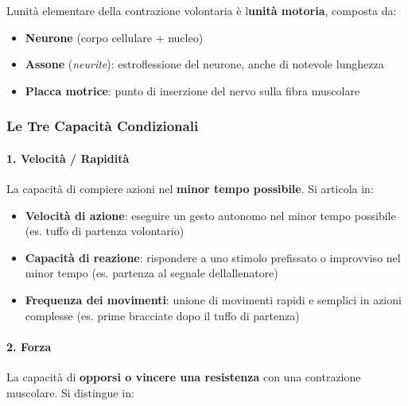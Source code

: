 \documentclass[a4paper,11pt]{article}
\providecommand{\tightlist}{%
  \setlength{\itemsep}{0pt}\setlength{\parskip}{0pt}}
\begin{document}
L\textquotesingle unità elementare della contrazione volontaria è
l\textquotesingle{}\textbf{unità motoria}, composta da:

\begin{itemize}
      \tightlist
      \item
            \textbf{Neurone} (corpo cellulare + nucleo)
      \item
            \textbf{Assone} (\emph{neurite}): estroflessione del neurone, anche di
            notevole lunghezza
      \item
            \textbf{Placca motrice}: punto di inserzione del nervo sulla fibra
            muscolare
\end{itemize}

\subsubsection{Le Tre Capacità
      Condizionali}\label{le-tre-capacituxe0-condizionali}

\paragraph{1. Velocità / Rapidità}\label{velocituxe0-rapidituxe0}

La capacità di compiere azioni nel \textbf{minor tempo possibile}. Si
articola in:

\begin{itemize}
      \tightlist
      \item
            \textbf{Velocità di azione}: eseguire un gesto autonomo nel minor
            tempo possibile (es. tuffo di partenza volontario)
      \item
            \textbf{Capacità di reazione}: rispondere a uno stimolo prefissato o
            improvviso nel minor tempo (es. partenza al segnale
            dell\textquotesingle allenatore)
      \item
            \textbf{Frequenza dei movimenti}: unione di movimenti rapidi e
            semplici in azioni complesse (es. prime bracciate dopo il tuffo di
            partenza)
\end{itemize}

\paragraph{2. Forza}\label{forza}

La capacità di \textbf{opporsi o vincere una resistenza} con una
contrazione muscolare. Si distingue in:
\end{document}
